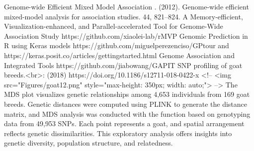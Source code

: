 \markdownRendererUlItem {} Genome-wide Efficient Mixed Model Association .  (2012). Genome-wide efficient mixed-model analysis for association studies.  44, 821–824.\markdownRendererUlItemEnd 
\markdownRendererUlItem {} A Memory-efficient, Visualization-enhanced, and Parallel-accelerated Tool for Genome-Wide Association Study https://github.com/xiaolei-lab/rMVP\markdownRendererUlItemEnd 
\markdownRendererUlItem {} Genomic Prediction in R using Keras models https://github.com/miguelperezenciso/GPtour and https://keras.posit.co/articles/getting\markdownRendererUnderscore{}started.html\markdownRendererUlItemEnd 
\markdownRendererUlItem {} Genome Association and Integrated Tools https://github.com/jiabowang/GAPIT\markdownRendererUlItemEnd 
\markdownRendererUlEnd \markdownRendererInterblockSeparator
{}
\markdownRendererSectionEnd \markdownRendererSectionBegin
{}\markdownRendererInterblockSeparator
{}\markdownRendererOlBeginTight
{}SNP profiling of goat breeds.<br>:  (2018) https://doi.org/10.1186/s12711-018-0422-x\markdownRendererOlItemEnd 
\markdownRendererOlEndTight \markdownRendererInterblockSeparator
{}<!-- <img src="Figures/goat12.png" style="max-height: 350px; width: auto;"> -->\markdownRendererInterblockSeparator
{}\markdownRendererInterblockSeparator
{}\markdownRendererInterblockSeparator
{}\markdownRendererInterblockSeparator
{}The MDS plot visualizes genetic relationships among 4,653 individuals from 169 goat breeds. Genetic distances were computed using PLINK to generate the distance matrix, and MDS analysis was conducted with the  function based on genotyping data from 49,953 SNPs. Each point represents a goat, and spatial arrangement reflects genetic dissimilarities. This exploratory analysis offers insights into genetic diversity, population structure, and relatedness.\markdownRendererInterblockSeparator
